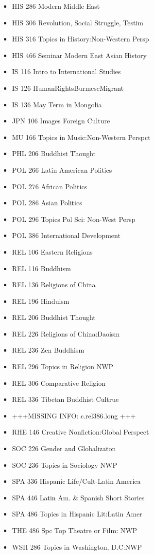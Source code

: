 \documentclass[
  letterpaper,
]{scrbook}
\begin{document}
\begin{itemize}
\item
  HIS 286 Modern Middle East
\item
  HIS 306 Revolution, Social Struggle, Testim
\item
  HIS 316 Topics in History:Non-Western Persp
\item
  HIS 466 Seminar Modern East Asian History
\item
  IS 116 Intro to International Studies
\item
  IS 126 HumanRightsBurmeseMigrant
\item
  IS 136 May Term in Mongolia
\item
  JPN 106 Images Foreign Culture
\item
  MU 166 Topics in Music:Non-Western Perspct
\item
  PHL 206 Buddhist Thought
\item
  POL 266 Latin American Politics
\item
  POL 276 African Politics
\item
  POL 286 Asian Politics
\item
  POL 296 Topics Pol Sci: Non-West Persp
\item
  POL 386 International Development
\item
  REL 106 Eastern Religions
\item
  REL 116 Buddhism
\item
  REL 136 Religions of China
\item
  REL 196 Hinduism
\item
  REL 206 Buddhist Thought
\item
  REL 226 Religions of China:Daoism
\item
  REL 236 Zen Buddhism
\item
  REL 296 Topics in Religion NWP
\item
  REL 306 Comparative Religion
\item
  REL 336 Tibetan Buddhist Cultrue
\item
  +++MISSING INFO: c.rel386.long +++
\item
  RHE 146 Creative Nonfiction:Global Perspect
\item
  SOC 226 Gender and Globalizaton
\item
  SOC 236 Topics in Sociology NWP
\item
  SPA 336 Hispanic Life/Cult-Latin America
\item
  SPA 446 Latin Am. \& Spanish Short Stories
\item
  SPA 486 Topics in Hispanic Lit:Latin Amer
\item
  THE 486 Spc Top Theatre or Film: NWP
\item
  WSH 286 Topics in Washington, D.C:NWP
\end{itemize}
\end{document}
